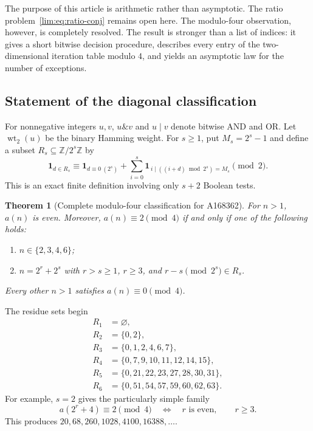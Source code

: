 \documentclass[11pt]{article}
\newtheorem{theorem}{Theorem}[section]
\theoremstyle{definition}
\theoremstyle{remark}
\newcommand{\wt}{\operatorname{wt}_2}
\newcommand{\band}{\mathbin{\&}}
\newcommand{\bor}{\mathbin{\vert}}
\newcommand{\ind}{\mathbf 1}
\begin{document}
The purpose of this article is arithmetic rather than asymptotic.  The ratio
problem~\eqref{lim:eq:ratio-conj} remains open here.  The modulo-four observation,
however, is completely resolved.  The result is stronger than a list of
indices: it gives a short bitwise decision procedure, describes every entry of
the two-dimensional iteration table modulo $4$, and yields an asymptotic law
for the number of exceptions.

\subsection{Statement of the diagonal classification}

For nonnegative integers $u,v$, $u\band v$ and $u\bor v$ denote bitwise AND
and OR.  Let $\wt(u)$ be the binary Hamming weight.  For $s\ge1$, put
$M_s=2^s-1$ and define a subset $R_s\subseteq\mathbb Z/2^s\mathbb Z$ by
\begin{equation}\label{lim:eq:R-def-intro}
\ind_{d\in R_s}
 \equiv
 \ind_{d\equiv0\ (2^s)}
 +\sum_{i=0}^{s}
   \ind_{\,i\bor((i+d)\bmod2^s)=M_s}
 \pmod2.
\end{equation}
This is an exact finite definition involving only $s+2$ Boolean tests.

\begin{theorem}[Complete modulo-four classification for A168362]
\label{lim:thm:diagonal-classification}
For $n>1$, $a(n)$ is even.  Moreover, $a(n)\equiv2\pmod4$ if and only if
one of the following holds:
\begin{enumerate}[label=\textup{(\roman*)}]
  \item $n\in\{2,3,4,6\}$;
  \item $n=2^r+2^s$ with $r>s\ge1$, $r\ge3$, and
        $r-s\pmod{2^s}\in R_s$.
\end{enumerate}
Every other $n>1$ satisfies $a(n)\equiv0\pmod4$.
\end{theorem}

The residue sets begin
\begin{align*}
R_1&=\varnothing,\\
R_2&=\{0,2\},\\
R_3&=\{0,1,2,4,6,7\},\\
R_4&=\{0,7,9,10,11,12,14,15\},\\
R_5&=\{0,21,22,23,27,28,30,31\},\\
R_6&=\{0,51,54,57,59,60,62,63\}.
\end{align*}
For example, $s=2$ gives the particularly simple family
\[
  a(2^r+4)\equiv2\pmod4
  \quad\Longleftrightarrow\quad r\text{ is even},
  \qquad r\ge3.
\]
This produces $20,68,260,1028,4100,16388,\ldots$.
\end{document}
